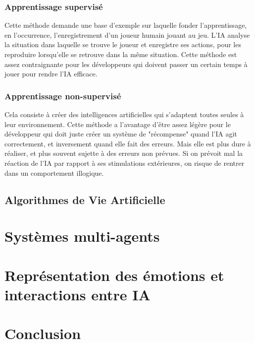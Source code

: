 \documentclass[asi]{picINSA}
\begin{document}
\subsection{Apprentissage supervisé}
Cette méthode demande une base d'exemple sur laquelle fonder l'apprentissage, en l'occurrence, l'enregistrement d'un joueur humain jouant au jeu. L'IA analyse la situation dans laquelle se trouve le joueur et enregistre ses actions, pour les reproduire lorsqu'elle se retrouve dans la même situation. Cette méthode est assez contraignante pour les développeurs qui doivent passer un certain temps à jouer pour rendre l'IA efficace.

\subsection{Apprentissage non-supervisé}
Cela consiste à créer des intelligences artificielles qui s'adaptent toutes seules à leur environnement. Cette méthode a l'avantage d'être assez légère pour le développeur qui doit juste créer un système de "récompense" quand l'IA agit correctement, et inversement quand elle fait des erreurs. Mais elle est plus dure à réaliser, et plus souvent sujette à des erreurs non prévues. Si on prévoit mal la réaction de l'IA par rapport à ses stimulations extérieures, on risque de rentrer dans un comportement illogique.
\section{Algorithmes de Vie Artificielle}
  
\chapter{Systèmes multi-agents}

\chapter{Représentation des émotions et interactions entre IA}

\chapter{Conclusion}


  
\end{document}
